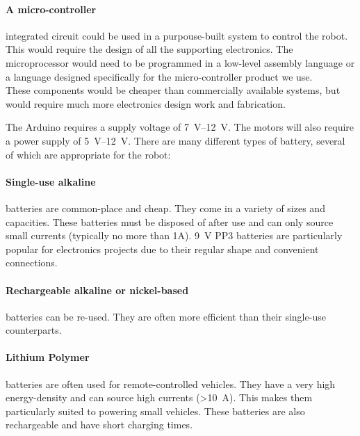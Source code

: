        \paragraph{A micro-controller} integrated circuit could be used in a purpouse-built system to control the robot. This would require the design of all the supporting electronics. The microprocessor would need to be programmed in a low-level assembly language or a language designed specifically for the micro-controller product we use.\\
        These components would be cheaper than commercially available systems, but would require much more electronics design work and fabrication.

        \label{outline: power}
            The \gls{Arduino} requires a supply voltage of \SIrange{7}{12}{\volt}. The motors will also require a power supply of \SIrange{5}{12}{\volt}. There are many different types of battery, several of which are appropriate for the robot:

            \paragraph{Single-use alkaline} batteries are common-place and cheap. They come in a variety of sizes and capacities. These batteries must be disposed of after use and can only source small currents (typically no more than 1A). \SI{9}{\volt} PP3 batteries are particularly popular for electronics projects due to their regular shape and convenient connections.
            \paragraph{Rechargeable alkaline or nickel-based} batteries can be re-used. They are often more efficient than their single-use counterparts.
            \paragraph{Lithium Polymer} batteries are often used for remote-controlled vehicles. They have a very high energy-density and can source high currents (>\SI{10}{\ampere}). This makes them particularly suited to powering small vehicles. These batteries are also rechargeable and have short charging times.


